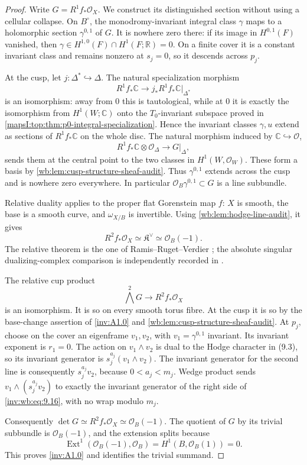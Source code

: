 \begin{proof}
Write \(G=R^1f_*\mathcal O_X\).  We construct its distinguished section
without using a cellular collapse.  On \(B^\circ\), the monodromy-invariant
integral class \(\gamma\) maps to a holomorphic section
\(\gamma^{0,1}\) of \(G\).  It is nowhere zero there: if its image in
\(H^{0,1}(F)\) vanished, then
\(\gamma\in H^{1,0}(F)\cap H^1(F;\mathbb R)=0\).  On a finite cover it is
a constant invariant class and remains nonzero at \(s_j=0\), so it
descends across \(p_j\).

At the cusp, let \(j:\Delta^*\hookrightarrow\Delta\).  The natural
specialization morphism
\[
 R^1f_*\mathbb C\longrightarrow
 j_*R^1f_*\mathbb C|_{\Delta^*}
\]
is an isomorphism: away from \(0\) this is tautological, while at \(0\) it
is exactly the isomorphism from \(H^1(W;\mathbb C)\) onto the
\(T_0\)-invariant subspace proved in
\cref{mapsI:top:thm:p0-integral-specialization}.  Hence the invariant classes
\(\gamma,u\) extend as sections of \(R^1f_*\mathbb C\) on the whole disc.
The natural morphism induced by \(\mathbb C\hookrightarrow\mathcal O\),
\[
 R^1f_*\mathbb C\otimes\mathcal O_\Delta
 \longrightarrow G|_\Delta,
\]
sends them at the central point to the two classes in
\(H^1(W,\mathcal O_W)\).  These form a basis by
\cref{wb:lem:cusp-structure-sheaf-audit}.  Thus
\(\gamma^{0,1}\) extends across the cusp and is nowhere zero everywhere.
In particular \(\mathcal O_B\gamma^{0,1}\subset G\) is a line subbundle.

Relative duality applies to the proper flat Gorenstein map \(f\): \(X\) is
smooth, the base is a smooth curve, and \(\omega_{X/B}\) is invertible.
Using \cref{wb:lem:hodge-line-audit}, it gives
\[
 R^2f_*\mathcal O_X\simeq\mathfrak K^\vee
 \simeq\mathcal O_B(-1).
\tag{WBA.9.15}\label{inv:wb:eq:9.15}
\]
The relative theorem is the one of Ramis--Ruget--Verdier
\cite[pp.~261--283]{RRV71}; the absolute singular
dualizing-complex comparison is independently recorded in
\cite[Theorems~1--2 and Proposition~2]{RR70}.

The relative cup product
\[
 \bigwedge^2G\longrightarrow R^2f_*\mathcal O_X
\tag{WBA.9.16}\label{inv:wb:eq:9.16}
\]
is an isomorphism.  It is so on every smooth torus fibre.  At the cusp it
is so by the base-change assertion of \cref{inv:A1.0} and \cref{wb:lem:cusp-structure-sheaf-audit}.  At \(p_j\),
choose on the cover an eigenframe \(v_1,v_2\), with
\(v_1=\gamma^{0,1}\) invariant.  Its invariant exponent is \(r_1=0\).
The action on \(v_1\wedge v_2\) is dual to the Hodge character in (9.3),
so its invariant generator is \(s_j^{a_j}(v_1\wedge v_2)\).
The invariant generator for the second line is consequently
\(s_j^{a_j}v_2\), because \(0<a_j<m_j\).  Wedge product sends
\(v_1\wedge(s_j^{a_j}v_2)\) to exactly the invariant generator of the
right side of \eqref{inv:wb:eq:9.16}, with no wrap modulo \(m_j\).

Consequently
\(\det G\simeq R^2f_*\mathcal O_X\simeq\mathcal O_B(-1)\).  The quotient
of \(G\) by its trivial subbundle is \(\mathcal O_B(-1)\), and the
extension splits because
\[
 \operatorname{Ext}^1(\mathcal O_B(-1),\mathcal O_B)
 =H^1(B,\mathcal O_B(1))=0.
\]
This proves \cref{inv:A1.0} and identifies the trivial summand.
\end{proof}

